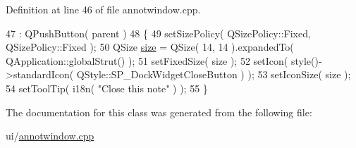 Definition at line 46 of file annotwindow.\+cpp.


\begin{DoxyCode}
47       : QPushButton( parent )
48     \{
49         setSizePolicy( QSizePolicy::Fixed, QSizePolicy::Fixed );
50         QSize \hyperlink{synctex__parser_8c_aa23c661441688350614bd6a350d2b6ff}{size} = QSize( 14, 14 ).expandedTo( QApplication::globalStrut() );
51         setFixedSize( size );
52         setIcon( style()->standardIcon( QStyle::SP\_DockWidgetCloseButton ) );
53         setIconSize( size );
54         setToolTip( i18n( \textcolor{stringliteral}{"Close this note"} ) );
55     \}
\end{DoxyCode}


The documentation for this class was generated from the following file\+:\begin{DoxyCompactItemize}
\item 
ui/\hyperlink{annotwindow_8cpp}{annotwindow.\+cpp}\end{DoxyCompactItemize}
